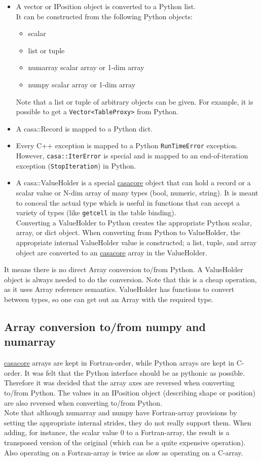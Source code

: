 \begin{itemize}
\item
A vector or IPosition object is converted to a Python list.
\\It can be constructed from the following Python objects:
\begin{itemize}
  \item scalar
  \item list or tuple
  \item numarray scalar array or 1-dim array
  \item numpy scalar array or 1-dim array
\end{itemize}
Note that a list or tuple of arbitrary objects can be given. For
example, it is possible to get a \texttt{Vector<TableProxy>} from Python.
\item
A casa::Record is mapped to a Python dict.
\item
Every C++ exception is mapped to a Python \texttt{RunTimeError}
exception. However, \texttt{casa::IterError} is special and 
is mapped to an end-of-iteration exception (\texttt{StopIteration}) in Python.
\item
A casa::ValueHolder is a special \href{http://casacore.googlecode.com}{casacore} object that can hold a record or
a scalar value or N-dim array of many types (bool, numeric, string).
It is meant to conceal the actual type which is useful in functions
that can accept a variety of types (like \texttt{getcell}
in the table binding).
\\Converting a ValueHolder to Python creates the appropriate Python
scalar, array, or dict object. When converting from
Python to ValueHolder, the appropriate internal ValueHolder value
is constructed; a list, tuple, and array object are converted to an
\href{http://casacore.googlecode.com}{casacore} array in the ValueHolder.
\end{itemize}
It means there is no direct Array conversion to/from Python. A
ValueHolder object is always needed to do the conversion. Note that
this is a cheap operation, as it uses Array reference semantics.
ValueHolder has functions to convert between types, so one can get
out an Array with the required type.

\subsection{Array conversion to/from numpy and numarray}
\href{http://casacore.googlecode.com}{casacore} arrays are kept in Fortran-order, while Python arrays are kept
in C-order. It was felt that the Python interface should be as 
pythonic as possible. Therefore it was decided that the array axes are
reversed when converting to/from Python.
The values in an IPosition object (describing shape or
position) are also reversed when converting to/from Python.
\\Note that although numarray and numpy have Fortran-array provisions
by setting the appropriate internal strides,
they do not really support them. When adding, for instance, the scalar
value 0 to a Fortran-array, the  result is a transposed version of the
original (which can be a quite expensive operation). Also operating on
a Fortran-array is twice as slow as operating on a C-array.

